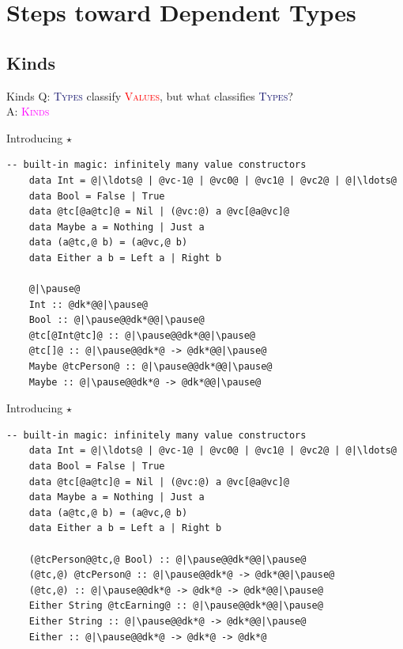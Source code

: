 \documentclass[xcolor={usenames,dvipsnames}]{beamer}
\newcommand{\htycon}[1]{\textcolor{MidnightBlue}{\textsc{#1}}}
\newcommand{\hvalcon}[1]{\textcolor{Red}{\textsc{#1}}}
\newcommand{\hkind}[1]{\textcolor{Fuchsia}{\textsc{#1}}}
\begin{document}
\section{Steps toward Dependent Types}

\subsection{Kinds}

\begin{frame}[fragile]{Kinds}
  Q: \htycon{Types} classify \hvalcon{Values}, but what classifies \htycon{Types}?\\
  \pause
  A: \hkind{Kinds}
\end{frame}

\begin{frame}[fragile]{Introducing $\star$}
  \begin{lstlisting}[style=hask]
    -- built-in magic: infinitely many value constructors
    data Int = @|\ldots@ | @vc-1@ | @vc0@ | @vc1@ | @vc2@ | @|\ldots@
    data Bool = False | True
    data @tc[@a@tc]@ = Nil | (@vc:@) a @vc[@a@vc]@
    data Maybe a = Nothing | Just a
    data (a@tc,@ b) = (a@vc,@ b)
    data Either a b = Left a | Right b

    @|\pause@
    Int :: @dk*@@|\pause@
    Bool :: @|\pause@@dk*@@|\pause@
    @tc[@Int@tc]@ :: @|\pause@@dk*@@|\pause@
    @tc[]@ :: @|\pause@@dk*@ -> @dk*@@|\pause@
    Maybe @tcPerson@ :: @|\pause@@dk*@@|\pause@
    Maybe :: @|\pause@@dk*@ -> @dk*@@|\pause@
  \end{lstlisting}
\end{frame}

\begin{frame}[fragile]{Introducing $\star$}
  \begin{lstlisting}[style=hask]
    -- built-in magic: infinitely many value constructors
    data Int = @|\ldots@ | @vc-1@ | @vc0@ | @vc1@ | @vc2@ | @|\ldots@
    data Bool = False | True
    data @tc[@a@tc]@ = Nil | (@vc:@) a @vc[@a@vc]@
    data Maybe a = Nothing | Just a
    data (a@tc,@ b) = (a@vc,@ b)
    data Either a b = Left a | Right b

    (@tcPerson@@tc,@ Bool) :: @|\pause@@dk*@@|\pause@
    (@tc,@) @tcPerson@ :: @|\pause@@dk*@ -> @dk*@@|\pause@
    (@tc,@) :: @|\pause@@dk*@ -> @dk*@ -> @dk*@@|\pause@
    Either String @tcEarning@ :: @|\pause@@dk*@@|\pause@
    Either String :: @|\pause@@dk*@ -> @dk*@@|\pause@
    Either :: @|\pause@@dk*@ -> @dk*@ -> @dk*@
  \end{lstlisting}
\end{frame}
\end{document}
